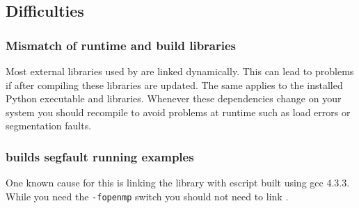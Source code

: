 \subsection{Difficulties}

\subsubsection{Mismatch of runtime and build libraries}
Most external libraries used by \esfinley are linked dynamically.
This can lead to problems if after compiling \esfinley these libraries are
updated.
The same applies to the installed Python executable and libraries.
Whenever these dependencies change on your system you should recompile
\esfinley to avoid problems at runtime such as load errors or segmentation
faults.

\subsubsection{\openmp builds segfault running examples}
One known cause for this is linking the  library with escript built using gcc 4.3.3.
While you need the \texttt{-fopenmp} switch you should not need to link .


